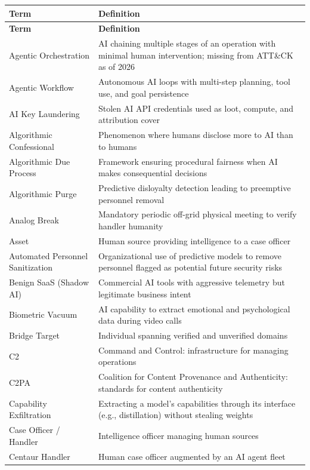 \documentclass[11pt,letterpaper]{article}
\newcommand{\etraneed}[1]{\par\ifdim\pagegoal<\maxdimen\ifdim\pagetotal<\pagegoal\ifdim\dimexpr\pagegoal-\pagetotal\relax<\dimexpr#1\relax\newpage\fi\fi\fi}
\begin{document}
\etraneed{6\baselineskip}
{\small
\begin{longtable}{L{4.8cm}L{11.4cm}}
\toprule
\textbf{Term} & \textbf{Definition} \\
\midrule
\endfirsthead
\toprule
\textbf{Term} & \textbf{Definition} \\
\midrule
\endhead
Agentic Orchestration & AI chaining multiple stages of an operation with minimal human intervention; missing from ATT\&CK as of 2026 \\*
Agentic Workflow & Autonomous AI loops with multi-step planning, tool use, and goal persistence \\
AI Key Laundering & Stolen AI API credentials used as loot, compute, and attribution cover \\
Algorithmic Confessional & Phenomenon where humans disclose more to AI than to humans \\
Algorithmic Due Process & Framework ensuring procedural fairness when AI makes consequential decisions \\
Algorithmic Purge & Predictive disloyalty detection leading to preemptive personnel removal \\
Analog Break & Mandatory periodic off-grid physical meeting to verify handler humanity \\
Asset & Human source providing intelligence to a case officer \\
Automated Personnel Sanitization & Organizational use of predictive models to remove personnel flagged as potential future security risks \\
Benign SaaS (Shadow AI) & Commercial AI tools with aggressive telemetry but legitimate business intent \\
Biometric Vacuum & AI capability to extract emotional and psychological data during video calls \\
Bridge Target & Individual spanning verified and unverified domains \\
C2 & Command and Control: infrastructure for managing operations \\
C2PA & Coalition for Content Provenance and Authenticity: standards for content authenticity \\
Capability Exfiltration & Extracting a model's capabilities through its interface (e.g., distillation) without stealing weights \\
Case Officer / Handler & Intelligence officer managing human sources \\
Centaur Handler & Human case officer augmented by an AI agent fleet \\

\end{longtable}}
\end{document}
